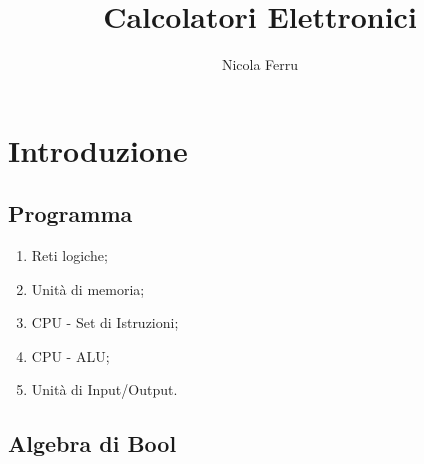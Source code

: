 \documentclass{book}
\title{Calcolatori Elettronici}
\author{Nicola Ferru}
\begin{document}
\maketitle
\chapter{Introduzione}
\section{Programma}
\begin{enumerate}
	\item Reti logiche;
	\item Unità di memoria;
	\item CPU - Set di Istruzioni;
	\item CPU - ALU;
	\item Unità di Input/Output.
\end{enumerate}
\section{Algebra di Bool}
\end{document}
